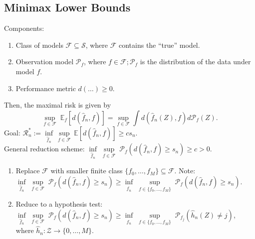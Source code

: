 \documentclass[10pt,twocolumn]{article}
\begin{document}
\subsection*{Minimax Lower Bounds}
        Components:
    \begin{enumerate}
        \itemsep-.5em
        \item Class of models $\mathcal{F} \subseteq \mathcal{S}$, where $\mathcal{F}$ contains the ``true'' model.
        \item Observation model $\mathcal{P}_f$, where $f \in \mathcal{F}; \mathcal{P}_f$ is the distribution of the data under model $f$.
        \item Performance metric $d(\ldots) \geq 0$.
    \end{enumerate}
    Then, the maximal risk is given by 
    \begin{equation}
        \underset{f\in \mathcal{F}}{\sup} \; \mathbb{E}_f \left[d(\hat{f}_n,f)\right] = \underset{f\in\mathcal{F}}{\sup} \int d(\hat{f}_n(Z),f)d\mathcal{P}_f(Z).
    \end{equation}
    Goal: $\mathcal{R}^*_n := \underset{\hat{f}_n}{\inf}\,\underset{f\in\mathcal{F}}{\sup} \,\mathbb{E} \left[d(\hat{f}_n,f)\right] \geq cs_n$.\\
    General reduction scheme: $\underset{\hat{f}_n}{\inf} \; \underset{f\in\mathcal{F}}{\sup} \; \mathcal{P}_f(d(\hat{f}_n,f) \geq s_n) \geq c > 0$.
    \begin{enumerate}
        \item Replace $\mathcal{F}$ with smaller finite class $\lbrace f_0,\ldots,f_M \rbrace \subseteq \mathcal{F}$. Note: $\underset{\hat{f}_n}{\inf} \; \underset{f\in\mathcal{F}}{\sup} \; \mathcal{P}_f(d(\hat{f}_n,f) \geq s_n) \geq \underset{\hat{f}_n}{\inf} \; \underset{f \in \lbrace f_0,\ldots,f_M \rbrace}{\sup} \; \mathcal{P}_f(d(\hat{f}_n,f) \geq s_n)$.
        \item Reduce to a hypothesis test: $\underset{\hat{f}_n}{\inf} \; \underset{f \in \mathcal{F}}{\sup} \; \mathcal{P}_f(d(\hat{f}_n,f) \geq s_n) \geq \underset{\hat{f}_n}{\inf} \; \underset{f \in \lbrace f_0,\ldots,f_M \rbrace}{\sup} \; \mathcal{P}_{f_j}(\hat{h}_n(Z) \neq j)$, where $\hat{h}_n : \mathcal{Z} \rightarrow \lbrace 0,\ldots,M \rbrace$.
    \end{enumerate}
\end{document}

